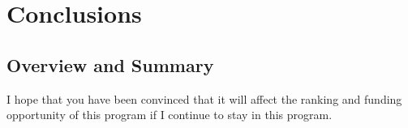\chapter{Conclusions}
\section{Overview and Summary}

I hope that you have been convinced that it will affect the ranking and funding opportunity of this program if I continue to stay in this program.


